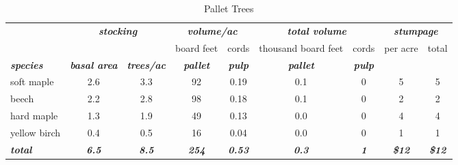 \documentclass[landscape]{article}
\begin{document}
\begin{table}[H]

\caption{\label{tab:unnamed-chunk-41}Pallet Trees}
\fontsize{10}{12}\selectfont
\begin{tabular}[t]{lcccccccc}
\toprule
\multicolumn{1}{c}{\em{\textbf{ }}} & \multicolumn{2}{c}{\em{\textbf{stocking}}} & \multicolumn{2}{c}{\em{\textbf{volume/ac }}} & \multicolumn{2}{c}{\em{\textbf{total volume}}} & \multicolumn{2}{c}{\em{\textbf{stumpage}}} \\
\cmidrule(l{3pt}r{3pt}){2-3} \cmidrule(l{3pt}r{3pt}){4-5} \cmidrule(l{3pt}r{3pt}){6-7} \cmidrule(l{3pt}r{3pt}){8-9}
\multicolumn{3}{c}{ } & \multicolumn{1}{c}{board feet} & \multicolumn{1}{c}{cords} & \multicolumn{1}{c}{thousand board feet} & \multicolumn{1}{c}{cords} & \multicolumn{1}{c}{per acre} & \multicolumn{1}{c}{total} \\
\cmidrule(l{3pt}r{3pt}){4-4} \cmidrule(l{3pt}r{3pt}){5-5} \cmidrule(l{3pt}r{3pt}){6-6} \cmidrule(l{3pt}r{3pt}){7-7} \cmidrule(l{3pt}r{3pt}){8-8} \cmidrule(l{3pt}r{3pt}){9-9}
\rowcolor[HTML]{DCDCDC}  \em{\textbf{species}} & \em{\textbf{basal area}} & \em{\textbf{trees/ac}} & \em{\textbf{pallet}} & \em{\textbf{pulp}} & \em{\textbf{pallet}} & \em{\textbf{pulp}} & \em{\textbf{ }} & \em{\textbf{ }}\\
\midrule
\rowcolor{gray!6}  soft maple & 2.6 & 3.3 & 92 & 0.19 & 0.1 & 0 & 5 & 5\\
 
beech & 2.2 & 2.8 & 98 & 0.18 & 0.1 & 0 & 2 & 2\\
 
\rowcolor{gray!6}  hard maple & 1.3 & 1.9 & 49 & 0.13 & 0.0 & 0 & 4 & 4\\
 
yellow birch & 0.4 & 0.5 & 16 & 0.04 & 0.0 & 0 & 1 & 1\\
 
\rowcolor{gray!6}  \rowcolor[HTML]{DCDCDC}  \em{\textbf{total}} & \em{\textbf{6.5}} & \em{\textbf{8.5}} & \em{\textbf{254}} & \em{\textbf{0.53}} & \em{\textbf{0.3}} & \em{\textbf{1}} & \em{\textbf{\$12}} & \em{\textbf{\$12}}\\
\bottomrule
\end{tabular}
\end{table}
\end{document}

